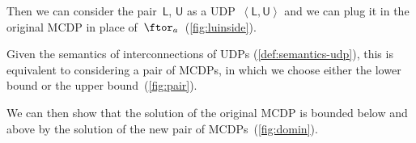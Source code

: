 \noindent Then we can consider the pair~$\boldsymbol{\mathsf{L}}$,
$\boldsymbol{\mathsf{U}}$ as a UDP~$\left\langle \boldsymbol{\mathsf{L}},\boldsymbol{\mathsf{U}}\right\rangle $
and we can plug it in the original MCDP in place of~$\ftor_{a}$~(\cref{fig:luinside}).
\begin{center}
\par\end{center}

\noindent Given the semantics of interconnections of UDPs (\cref{def:semantics-udp}),
this is equivalent to considering a pair of MCDPs, in which we choose
either the lower bound or the upper bound~(\cref{fig:pair}).
\begin{center}
\par\end{center}

\noindent We can then show that the solution of the original MCDP
is bounded below and above by the solution of the new pair of MCDPs~(\cref{fig:domin}).
\begin{center}
\par\end{center}


